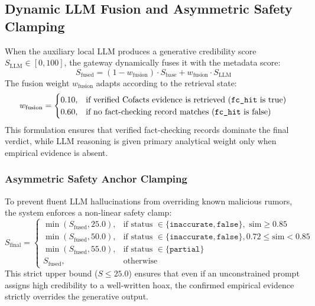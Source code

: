 \documentclass[twoside]{llncs}
\begin{document}
\subsection{Dynamic LLM Fusion and Asymmetric Safety Clamping}
When the auxiliary local LLM produces a generative credibility score $S_{\text{LLM}} \in [0, 100]$, the gateway dynamically fuses it with the metadata score:
\begin{equation}
S_{\text{fused}} = (1 - w_{\text{fusion}}) \cdot S_{\text{base}} + w_{\text{fusion}} \cdot S_{\text{LLM}}
\end{equation}
The fusion weight $w_{\text{fusion}}$ adapts according to the retrieval state:
\begin{equation}
w_{\text{fusion}} = 
\begin{cases}
0.10, & \text{if verified Cofacts evidence is retrieved (\texttt{fc\_hit} is true)} \\
0.60, & \text{if no fact-checking record matches (\texttt{fc\_hit} is false)}
\end{cases}
\end{equation}
This formulation ensures that verified fact-checking records dominate the final verdict, while LLM reasoning is given primary analytical weight only when empirical evidence is absent.

\subsubsection{Asymmetric Safety Anchor Clamping}
To prevent fluent LLM hallucinations from overriding known malicious rumors, the system enforces a non-linear safety clamp:
\begin{equation}
S_{\text{final}} =
\begin{cases}
\min(S_{\text{fused}}, 25.0), & \text{if status } \in \{\texttt{inaccurate}, \texttt{false}\}, \text{ sim} \ge 0.85 \\
\min(S_{\text{fused}}, 50.0), & \text{if status } \in \{\texttt{inaccurate}, \texttt{false}\}, 0.72 \le \text{sim} < 0.85 \\
\min(S_{\text{fused}}, 55.0), & \text{if status } \in \{\texttt{partial}\} \\
S_{\text{fused}}, & \text{otherwise}
\end{cases}
\end{equation}
This strict upper bound ($S \le 25.0$) ensures that even if an unconstrained prompt assigns high credibility to a well-written hoax, the confirmed empirical evidence strictly overrides the generative output.
\end{document}
